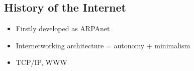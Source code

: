\subsection{History of the Internet}
\begin{itemize}
	\item Firstly developed as ARPAnet
	\item Internetworking architecture = autonomy + minimalism
	\item TCP/IP, WWW
\end{itemize}

\pagebreak
